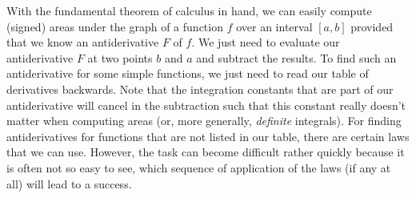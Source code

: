 \medskip
With the fundamental theorem of calculus in hand, we can easily compute (signed) areas under the graph of a function $f$ over an interval $[a,b]$ provided that we know an antiderivative $F$ of $f$. We just need to evaluate our antiderivative $F$ at two points $b$ and $a$ and subtract the results. To find such an antiderivative for some simple functions, we just need to read our table of derivatives backwards. Note that the integration constants that are part of our antiderivative will cancel in the subtraction such that this constant really doesn't matter when computing areas (or, more generally, \emph{definite} integrals). For finding antiderivatives for functions that are not listed in our table, there are certain laws that we can use. However, the task can become difficult rather quickly because it is often not so easy to see, which sequence of application of the laws (if any at all) will lead to a success.










